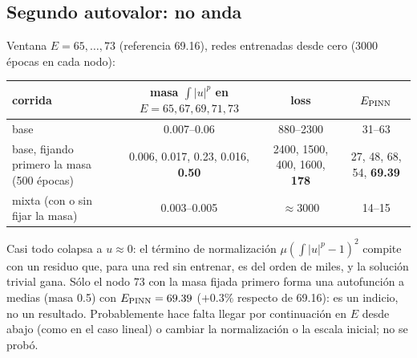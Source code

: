 \documentclass[11pt,a4paper]{article}
\begin{document}
\subsection{Segundo autovalor: no anda}
Ventana $E=65,\dots,73$ (referencia 69.16), redes entrenadas desde cero (3000 épocas en cada nodo):
\begin{center}
\begin{tabular}{lccc}
\toprule
corrida & masa $\int|u|^p$ en $E=65,67,69,71,73$ & loss & $E_{\rm PINN}$\\
\midrule
base & 0.007--0.06 & 880--2300 & 31--63\\
base, fijando primero la masa (500 épocas) & 0.006, 0.017, 0.23, 0.016, \textbf{0.50} & 2400, 1500, 400, 1600, \textbf{178} & 27, 48, 68, 54, \textbf{69.39}\\
mixta (con o sin fijar la masa) & 0.003--0.005 & $\approx3000$ & 14--15\\
\bottomrule
\end{tabular}
\end{center}
Casi todo colapsa a $u\approx0$: el término de normalización $\mu(\int|u|^p-1)^2$ compite con un residuo que, para una red
sin entrenar, es del orden de miles, y la solución trivial gana. Sólo el nodo $73$ con la masa fijada primero forma una
autofunción a medias (masa 0.5) con $E_{\rm PINN}=69.39$ ($+0.3\%$ respecto de 69.16): es un indicio, no un resultado.
Probablemente hace falta llegar por continuación en $E$ desde abajo (como en el caso lineal) o cambiar la normalización
o la escala inicial; no se probó.

\end{document}
